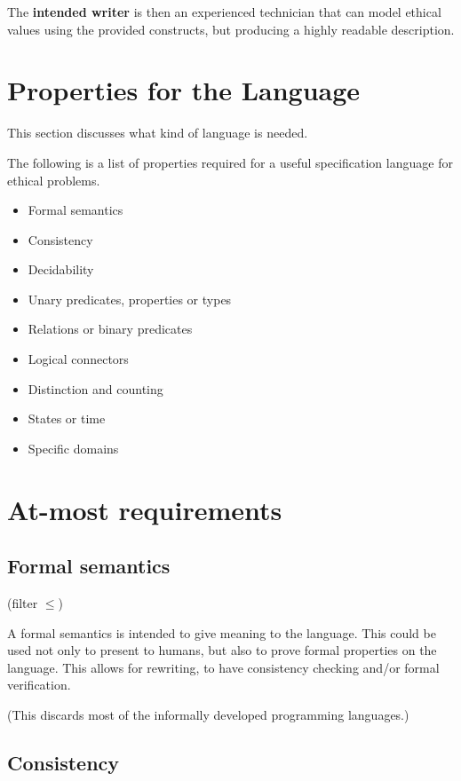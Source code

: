 The \textbf{intended writer} is then an experienced technician that can model ethical values using the provided constructs, but producing a highly readable description.


\section{Properties for the Language}

This section discusses what kind of language is needed.

The following is a list of properties required for a useful specification language for ethical problems.

\begin{itemize}
    \item Formal semantics
    \item Consistency
    \item Decidability
    \item Unary predicates, properties or types
    \item Relations or binary predicates
    \item Logical connectors
    \item Distinction and counting
    \item States or time
    \item Specific domains
\end{itemize}


\section{At-most requirements}

\subsection{Formal semantics}

(filter $\leq $)

A formal semantics is intended to give meaning to the language.
This could be used not only to present to humans, but also to prove formal properties on the language.
This allows for rewriting, to have consistency checking and/or formal verification.

(This discards most of the informally developed programming languages.)

\subsection{Consistency}

